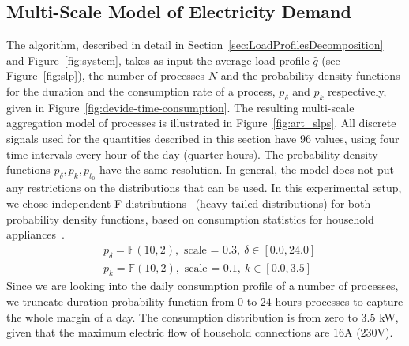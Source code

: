 \documentclass[conference]{IEEEtran}
\begin{document}
\subsection{Multi-Scale Model of Electricity Demand}
\label{sec:Results_Synthetic}

The algorithm, described in detail in Section~\ref{sec:LoadProfilesDecomposition} and Figure~\ref{fig:system}, takes as input the average load profile $\hat{q}$ (see Figure~\ref{fig:slp}), the number of processes $N$ and the probability density functions for the duration and the consumption rate of a process, $p_{\delta} $ and $p_k$ respectively, given in Figure~\ref{fig:devide-time-consumption}. The resulting multi-scale aggregation model of processes is illustrated in Figure~\ref{fig:art_slps}.
All discrete signals used for the quantities described in this section have $96$ values, using four time intervals every hour of the day (quarter hours). The probability density functions $p_{\delta}, p_k, p_{t_0}$ have the same resolution. In general, the model does not put any restrictions on the distributions that can be used. In this experimental setup, we chose independent F-distributions~\cite{winer1971statistical} (heavy tailed distributions) for both probability density functions, based on consumption statistics for household appliances~\cite{zimmermann2012household}.
\begin{align*}
&p_{\delta} = \mathbb{F}(10, 2), \text{ scale = $0.3$}, ~ \delta \in [0.0, 24.0]\\
&p_k = \mathbb{F}(10, 2), \text{ scale = $0.1$},~ k \in [0.0, 3.5]
\end{align*}
Since we are looking into the daily consumption profile of a number of processes, we truncate duration probability function from $0$ to $24$ hours processes to capture the whole margin of a day. The consumption distribution is from zero to $3.5$ kW, given that the maximum electric flow of household connections are $16$A ($230$V).
\end{document}
